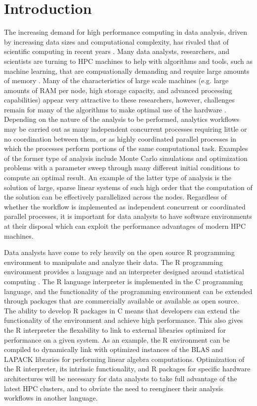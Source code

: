 \graphicspath{{plots/}}
\section{Introduction}

The increasing demand for high performance computing in data analysis, driven by
increasing data sizes and computational complexity, has rivaled that of scientific
computing in recent years \cite{fox:bdBenchmarking, kouzes:paradigm}. Many data analysts,
researchers, and scientists are turning to HPC machines to help with algorithms and tools,
such as machine learning, that are compuationally demanding and require large amounts of
memory \cite{raj:hpcBigData}. Many of the characteristics of large scale machines (e.g.
large amounts of RAM per node, high storage capacity, and advanced processing
capabilities) appear very attractive to these researchers, however, challenges remain for
many of the algorithms to make optimal use of the hardware \cite{lee:model}. Depending on
the nature of the analysis to be performed, analytics workflows may be carried out as many
independent concurrent processes requiring little or no coordination between them, or as
highly coordinated parallel processes in which the processes perform portions of the same
computational task. Examples of the former type of analysis include Monte Carlo
simulations and optimization problems with a parameter sweep through many different
initial conditions to compute an optimal result.  An example of the latter type of
analysis is the solution of large, sparse linear systems of such high order that the
computation of the solution can be effectively parallelized across the nodes. Regardless
of whether the workflow is implemented as independent concurrent or coordinated parallel
processes, it is important for data analysts to have software environments at their
disposal which can exploit the performance advantages of modern HPC machines.

Data analysts have come to rely heavily on the open source R programming environment to
manipulate and analyze their data. The R programming environment provides a language and
an interpreter designed around statistical computing \cite{ihaka:R}. The R language
interpreter is implemented in the C programming language, and the functionality of the
programming environment can be extended through packages that are commercially available
or available as open source. The ability to develop R packages in C means that developers
can extend the functionality of the environment and achieve high performance. This also
gives the R interpreter the flexability to link to external libraries optimized for
performance on a given system. As an example, the R environment can be compiled to
dynamically link with optimized instances of the BLAS \cite{dongarra:1990blas} and LAPACK
\cite{hammarling:1988blas} libraries for performing linear algebra computations.
Optimization of the R interpreter, its intrinsic functionality, and R packages for
specific hardware architectures will be necessary for data analysts to take full advantage
of the latest HPC clusters, and to obviate the need to reengineer their analysis workflows
in another language.

